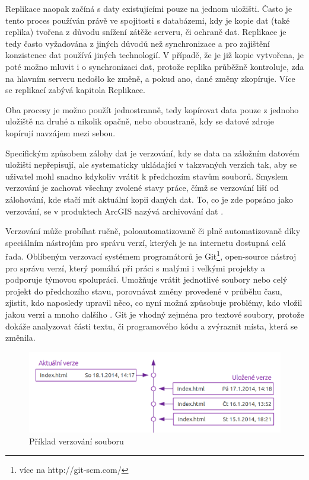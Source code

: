 Replikace naopak začíná s daty existujícími pouze na jednom uložišti. Často je tento proces používán právě ve spojitosti s databázemi, kdy je kopie dat (také replika) tvořena z důvodu snížení zátěže serveru, či ochraně dat. Replikace je tedy často vyžadována z jiných důvodů než synchronizace a pro zajištění konzistence dat používá jiných technologií. V případě, že je již kopie vytvořena, je poté možno mluvit i o synchronizaci dat, protože replika průběžně kontroluje, zda na hlavním serveru nedošlo ke změně, a pokud ano, dané změny zkopíruje. Více se replikací zabývá kapitola  Replikace.

Oba procesy je možno použít jednostranně, tedy kopírovat data pouze z jednoho uložiště na druhé a nikolik opačně, nebo oboustraně, kdy se datové zdroje kopírují navzájem mezi sebou.

Specifickým způsobem zálohy dat je verzování, kdy se data na záložním datovém uložišti nepřepisují, ale systematicky ukládající v takzvaných verzích tak, aby se uživatel mohl snadno kdykoliv vrátit k předchozím stavům souborů. Smyslem verzování je zachovat všechny zvolené stavy práce, čímž se verzování liší od zálohování, kde stačí mít aktuální kopii daných dat. To, co je zde popsáno jako verzování, se v produktech ArcGIS nazývá archivování dat \citep{Law2008}. 

Verzování může probíhat ručně, poloautomatizovaně či plně automatizovaně díky speciálním nástrojům pro správu verzí, kterých je na internetu dostupná celá řada. Oblíbeným verzovací systémem programátorů je Git\footnote{více na http://git-scm.com/}, open-source nástroj pro správu verzí, který pomáhá při práci s malými i velkými projekty a podporuje týmovou spolupráci. Umožňuje vrátit jednotlivé soubory nebo celý projekt do předchozího stavu, porovnávat změny provedené v průběhu času, zjistit, kdo naposledy upravil něco, co nyní možná způsobuje problémy, kdo vložil jakou verzi a mnoho dalšího \citep{Chacon2009}. Git je vhodný zejména pro textové soubory, protože dokáže analyzovat části textu, či programového kódu a zvýraznit místa, která se změnila.
        
          \begin{figure}[H]
            \centering
            \includegraphics[scale=1]{../../../grafy/obr/schema_verzovani_maxiTence.png}
            \caption {Příklad verzování souboru}
          \end{figure}

